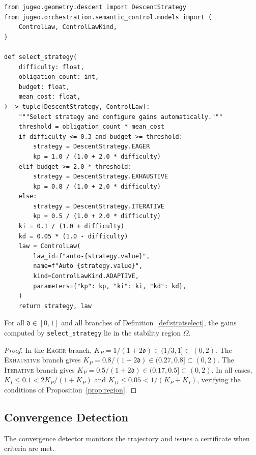 \documentclass[11pt]{article}
\newcommand{\Kp}{K_P}                      %
\newcommand{\Ki}{K_I}                      %
\newcommand{\Kd}{K_D}                      %
\newcommand{\GainRegion}{\Omega}           %
\newcommand{\difficulty}{\mathfrak{d}}     %
\begin{document}
\begin{lstlisting}[style=jugeo-python,
  caption={Automatic strategy selection.},
  label={lst:select_api}]
from jugeo.geometry.descent import DescentStrategy
from jugeo.orchestration.semantic_control.models import (
    ControlLaw, ControlLawKind,
)

def select_strategy(
    difficulty: float,
    obligation_count: int,
    budget: float,
    mean_cost: float,
) -> tuple[DescentStrategy, ControlLaw]:
    """Select strategy and configure gains automatically."""
    threshold = obligation_count * mean_cost
    if difficulty <= 0.3 and budget >= threshold:
        strategy = DescentStrategy.EAGER
        kp = 1.0 / (1.0 + 2.0 * difficulty)
    elif budget >= 2.0 * threshold:
        strategy = DescentStrategy.EXHAUSTIVE
        kp = 0.8 / (1.0 + 2.0 * difficulty)
    else:
        strategy = DescentStrategy.ITERATIVE
        kp = 0.5 / (1.0 + 2.0 * difficulty)
    ki = 0.1 / (1.0 + difficulty)
    kd = 0.05 * (1.0 - difficulty)
    law = ControlLaw(
        law_id=f"auto-{strategy.value}",
        name=f"Auto {strategy.value}",
        kind=ControlLawKind.ADAPTIVE,
        parameters={"kp": kp, "ki": ki, "kd": kd},
    )
    return strategy, law
\end{lstlisting}

\begin{proposition}
  \label{prop:selectstable}
  For all $\difficulty \in [0,1]$ and all branches of
  Definition~\ref{def:stratselect}, the gains computed by
  \texttt{select\_strategy} lie in the stability region $\GainRegion$.
\end{proposition}
\begin{proof}
  In the \textsc{Eager} branch, $\Kp = 1/(1+2\difficulty) \in (1/3, 1]
  \subset (0, 2)$.  The \textsc{Exhaustive} branch gives
  $\Kp = 0.8/(1+2\difficulty) \in (0.27, 0.8] \subset (0, 2)$.
  The \textsc{Iterative} branch gives
  $\Kp = 0.5/(1+2\difficulty) \in (0.17, 0.5] \subset (0, 2)$.
  In all cases, $\Ki \leq 0.1 < 2\Kp/(1+\Kp)$ and
  $\Kd \leq 0.05 < 1/(\Kp + \Ki)$, verifying the conditions
  of Proposition~\ref{prop:region}.
\end{proof}

\subsection{Convergence Detection}

The convergence detector monitors the trajectory and issues a
certificate when criteria are met.
\end{document}
